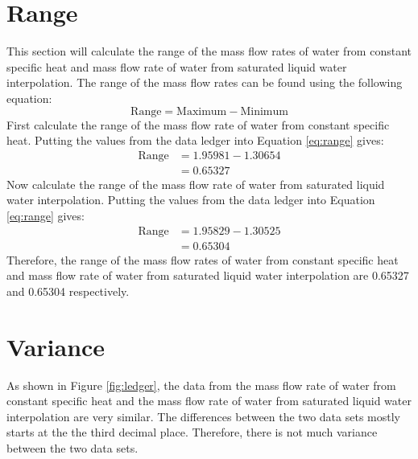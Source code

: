 \documentclass[12pt, titlepage]{article}
\begin{document}
\section{Range}
This section will calculate the range of the mass flow rates of water from constant
specific heat and mass flow rate of water from saturated liquid water interpolation.
The range of the mass flow rates can be found using the following equation:
\begin{equation}
  \text{Range} = \text{Maximum} - \text{Minimum}
  \label{eq:range}
\end{equation}
First calculate the range of the mass flow rate of water from constant specific
heat. Putting the values from the data ledger into Equation \ref{eq:range} gives:
\begin{align}
  \text{Range} &= 1.95981 - 1.30654 \nonumber \\
  &= 0.65327
  \label{eq:range_constant_specific_heat}
\end{align}
Now calculate the range of the mass flow rate of water from saturated liquid water
interpolation. Putting the values from the data ledger into Equation \ref{eq:range}
gives:
\begin{align}
  \text{Range} &= 1.95829 - 1.30525 \nonumber \\
  &= 0.65304
  \label{eq:range_saturated_liquid_water_interpolation}
\end{align}
Therefore, the range of the mass flow rates of water from constant specific heat
and mass flow rate of water from saturated liquid water interpolation are 0.65327
and 0.65304 respectively.
\section{Variance}
As shown in Figure \ref{fig:ledger}, the data from the mass flow rate of water
from constant specific heat and the mass flow rate of water from saturated liquid
water interpolation are very similar. The differences between the two data sets
mostly starts at the the third decimal place. Therefore, there is not much variance
between the two data sets.
\end{document}
